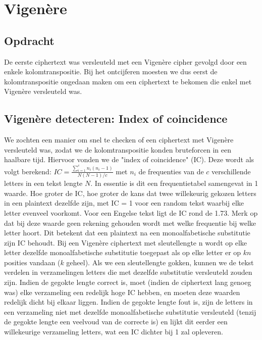 
\section{Vigen\`ere}
\subsection{Opdracht}
De eerste ciphertext was versleuteld met een Vigen\`ere cipher gevolgd door een enkele kolomtranspositie. Bij het ontcijferen moesten we dus eerst de kolomtranspositie ongedaan maken om een ciphertext te bekomen die enkel met Vigen\`ere versleuteld was. 

\subsection{Vigen\`ere detecteren: Index of coincidence}
We zochten een manier om snel te checken of een ciphertext met Vigen\`ere versleuteld was, zodat we de kolomtranspositie konden bruteforcen in een haalbare tijd. Hiervoor vonden we de "index of coincidence" (IC). Deze wordt als volgt berekend: $IC = \frac{\sum_{i=1}^{c}n_i(n_i -1)}{N(N-1)/c}$ met $n_i$ de frequenties van de $c$ verschillende letters in een tekst lengte $N$. In essentie is dit een frequentietabel samengevat in 1 waarde. Hoe groter de IC, hoe groter de kans dat twee willekeurig gekozen letters in een plaintext dezelfde zijn, met IC = 1 voor een random tekst waarbij elke letter evenveel voorkomt. Voor een Engelse tekst ligt de IC rond de 1.73. Merk op dat bij deze waarde geen rekening gehouden wordt met welke frequentie bij welke letter hoort. Dit betekent dat een plaintext na een monoalfabetische substitutie zijn IC behoudt. Bij een Vigen\`ere ciphertext met sleutellengte n wordt op elke letter dezelfde monoalfabetische substitutie toegepast als op elke letter er op $kn$ posities vandaan ($k$ geheel). Als we een sleutellengte gokken, kunnen we de tekst verdelen in verzamelingen letters die met dezelfde substitutie versleuteld zouden zijn. Indien de gegokte lengte correct is, moet (indien de ciphertext lang genoeg was) elke verzameling een redelijk hoge IC hebben, en moeten deze waarden redelijk dicht bij elkaar liggen. Indien de gegokte lengte fout is, zijn de letters in een verzameling niet met dezelfde monoalfabetische substitutie versleuteld (tenzij de gegokte lengte een veelvoud van de correcte is) en lijkt dit eerder een willekeurige verzameling letters, wat een IC dichter bij 1 zal opleveren. \\

